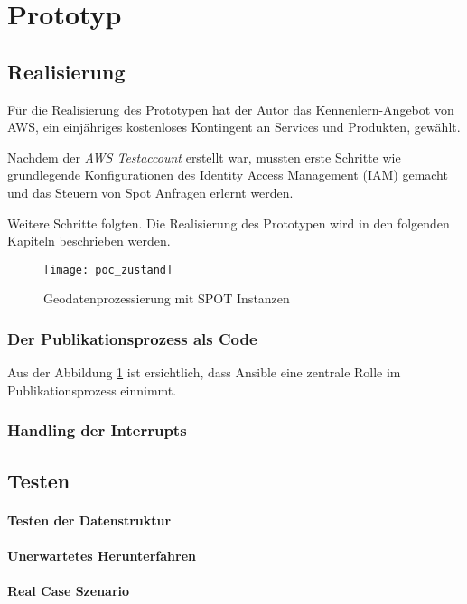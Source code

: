 \section{Prototyp}
\subsection{Realisierung}
Für die Realisierung des Prototypen hat der Autor das Kennenlern-Angebot von AWS, ein einjähriges kostenloses Kontingent an Services und Produkten\cite{FreeTier2020}, gewählt. 

Nachdem der \emph{AWS Testaccount} erstellt war, mussten erste Schritte wie grundlegende Konfigurationen des Identity Access Management (IAM) gemacht und das Steuern von Spot Anfragen erlernt werden.

Weitere Schritte folgten. Die Realisierung des Prototypen wird in den folgenden Kapiteln beschrieben werden.

\begin{figure}[H]
	\centering
	\texttt{[image: poc\_zustand]}
	\caption{Geodatenprozessierung mit SPOT Instanzen}
	\label{fig:ist_zustand}
\end{figure}

\subsubsection{Der Publikationsprozess als Code}
Aus der Abbildung \ref{fig:ist_zustand} ist ersichtlich, dass Ansible eine zentrale Rolle im Publikationsprozess einnimmt. 

\subsubsection{Handling der Interrupts}



\subsection{Testen}

\paragraph{Testen der Datenstruktur}


\paragraph{Unerwartetes Herunterfahren}


\paragraph{Real Case Szenario}

